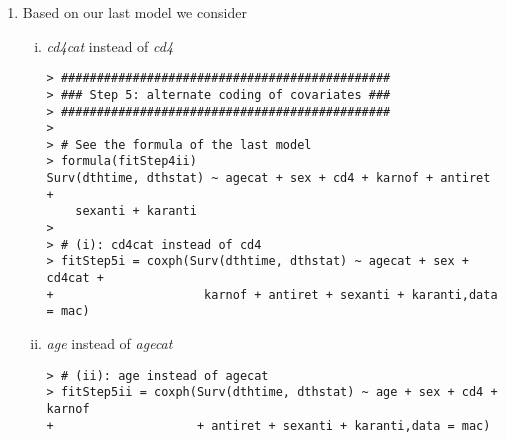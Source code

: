 \begin{enumerate}[(a)]
\begin{enumerate}[Step 1:]
\begin{enumerate}[(i)]
\begin{spacing}{1.2}
\begin{footnotesize}
\begin{verbatim}
       Step Df  Deviance Resid. Df Resid. Dev      AIC
1                             1162   6622.959 6667.959
2  - sexkar  1 0.1823756      1163   6623.142 6665.142
3 - cd4anti  1 0.1664674      1164   6623.308 6662.308
4   - agkar  1 0.2457168      1165   6623.554 6659.554
5  - sexcd4  1 0.6021998      1166   6624.156 6657.156
6   - agsex  1 0.5886611      1167   6624.745 6654.745
7  - aganti  1 0.6292394      1168   6625.374 6652.374
8   - agcd4  1 0.7502989      1169   6626.124 6650.124
9  - cd4kar  1 1.6707913      1170   6627.795 6648.795
\end{verbatim}
\end{footnotesize}
\end{spacing}
Note that since we want to carry out a backward procedure, we started with the full model. The interaction terms of antiretroviral therapy with the karnofsky score and sex were finally added in the model.
\end{enumerate}
\item Based on our last model we consider
\begin{enumerate}[(i)] 
\item \emph{cd4cat} instead of \emph{cd4}
\begin{spacing}{1.2}
\begin{footnotesize}
\begin{verbatim}
> ##############################################
> ### Step 5: alternate coding of covariates ###
> ##############################################
> 
> # See the formula of the last model
> formula(fitStep4ii)
Surv(dthtime, dthstat) ~ agecat + sex + cd4 + karnof + antiret + 
    sexanti + karanti
> 
> # (i): cd4cat instead of cd4
> fitStep5i = coxph(Surv(dthtime, dthstat) ~ agecat + sex + cd4cat + 
+                     karnof + antiret + sexanti + karanti,data = mac)
\end{verbatim}
\end{footnotesize}
\end{spacing}
\item \emph{age} instead of \emph{agecat}
\begin{spacing}{1.2}
\begin{footnotesize}
\begin{verbatim}
> # (ii): age instead of agecat
> fitStep5ii = coxph(Surv(dthtime, dthstat) ~ age + sex + cd4 + karnof 
+                    + antiret + sexanti + karanti,data = mac)
\end{verbatim}
\end{footnotesize}
\end{spacing}

\end{enumerate}
\end{enumerate}
\end{enumerate}
